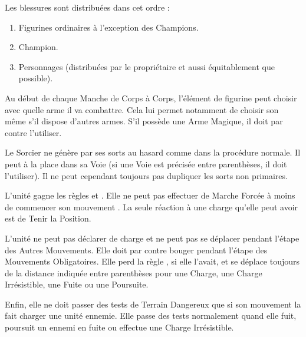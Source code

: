 Les blessures sont distribuées dans cet ordre :
\begin{enumerate}
\item Figurines ordinaires à l'exception des Champions.
\item Champion.
\item Personnages (distribuées par le propriétaire et aussi équitablement que possible).
\end{enumerate}


Au début de chaque Manche de Corps à Corps, l'élément de figurine peut choisir avec quelle arme il va combattre. Cela lui permet notamment de choisir son \hw{} même s'il dispose d'autres armes. S'il possède une Arme Magique, il doit par contre l'utiliser.


Le Sorcier ne génère par ses sorts au hasard comme dans la procédure normale. Il peut à la place  dans sa Voie (si une Voie est précisée entre parenthèses, il doit l'utiliser). Il ne peut cependant toujours pas dupliquer les sorts non primaires.


L'unité gagne les règles \immunetopsychology{} et \unstable{}. Elle ne peut pas effectuer de Marche Forcée à moins de commencer son mouvement . La seule réaction à une charge qu'elle peut avoir est de Tenir la Position.

\newpage
{}

L'unité ne peut pas déclarer de charge et ne peut pas se déplacer pendant l'étape des Autres Mouvements. Elle doit par contre bouger pendant l'étape des Mouvements Obligatoires. Elle perd la règle \swiftstride{}, si elle l'avait, et se déplace toujours de la distance indiquée entre parenthèses pour une Charge, une Charge Irrésistible, une Fuite ou une Poursuite.

 Enfin, elle ne doit passer des tests de Terrain Dangereux que si son mouvement la fait charger une unité ennemie. Elle passe des tests normalement quand elle fuit, poursuit un ennemi en fuite ou effectue une Charge Irrésistible.

